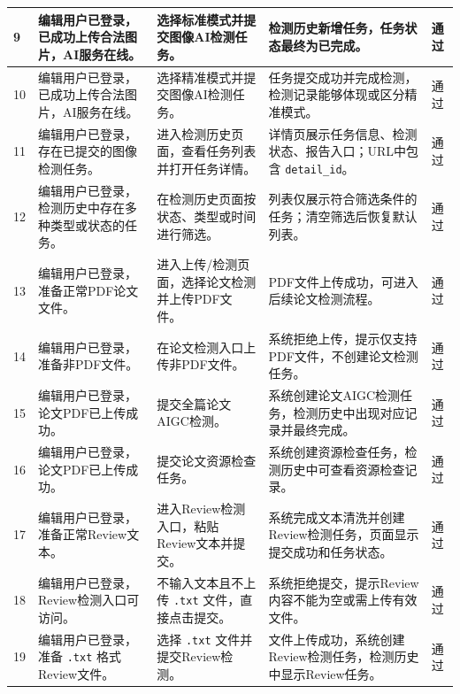\documentclass[UTF8,a4paper,12pt]{ctexart}
\newcommand{\pass}{通过}
\begin{document}
\begin{longtable}{|P{0.9cm}|P{3.5cm}|P{4.7cm}|P{5.0cm}|P{1.2cm}|}
9 & 编辑用户已登录，已成功上传合法图片，AI服务在线。 & 选择标准模式并提交图像AI检测任务。 & 检测历史新增任务，任务状态最终为已完成。 & \pass \\
\hline

10 & 编辑用户已登录，已成功上传合法图片，AI服务在线。 & 选择精准模式并提交图像AI检测任务。 & 任务提交成功并完成检测，检测记录能够体现或区分精准模式。 & \pass \\
\hline

11 & 编辑用户已登录，存在已提交的图像检测任务。 & 进入检测历史页面，查看任务列表并打开任务详情。 & 详情页展示任务信息、检测状态、报告入口；URL中包含 \texttt{detail\_id}。 & \pass \\
\hline

12 & 编辑用户已登录，检测历史中存在多种类型或状态的任务。 & 在检测历史页面按状态、类型或时间进行筛选。 & 列表仅展示符合筛选条件的任务；清空筛选后恢复默认列表。 & \pass \\
\hline

13 & 编辑用户已登录，准备正常PDF论文文件。 & 进入上传/检测页面，选择论文检测并上传PDF文件。 & PDF文件上传成功，可进入后续论文检测流程。 & \pass \\
\hline

14 & 编辑用户已登录，准备非PDF文件。 & 在论文检测入口上传非PDF文件。 & 系统拒绝上传，提示仅支持PDF文件，不创建论文检测任务。 & \pass \\
\hline

15 & 编辑用户已登录，论文PDF已上传成功。 & 提交全篇论文AIGC检测。 & 系统创建论文AIGC检测任务，检测历史中出现对应记录并最终完成。 & \pass \\
\hline

16 & 编辑用户已登录，论文PDF已上传成功。 & 提交论文资源检查任务。 & 系统创建资源检查任务，检测历史中可查看资源检查记录。 & \pass \\
\hline

17 & 编辑用户已登录，准备正常Review文本。 & 进入Review检测入口，粘贴Review文本并提交。 & 系统完成文本清洗并创建Review检测任务，页面显示提交成功和任务状态。 & \pass \\
\hline

18 & 编辑用户已登录，Review检测入口可访问。 & 不输入文本且不上传 \texttt{.txt} 文件，直接点击提交。 & 系统拒绝提交，提示Review内容不能为空或需上传有效文件。 & \pass \\
\hline

19 & 编辑用户已登录，准备 \texttt{.txt} 格式Review文件。 & 选择 \texttt{.txt} 文件并提交Review检测。 & 文件上传成功，系统创建Review检测任务，检测历史中显示Review任务。 & \pass \\
\hline


\end{longtable}
\end{document}
